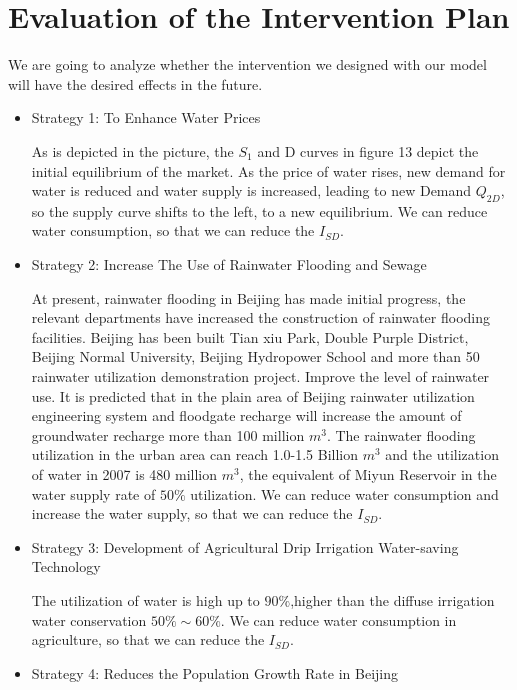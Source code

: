\documentclass{mcmthesis}
\begin{document}
\section{Evaluation of the Intervention Plan}
\par We are going to analyze whether the intervention we designed with our model will have the desired effects in the future.
\begin{itemize}
	\item Strategy 1: To Enhance Water Prices
	
	\par As is depicted in the picture, the $S_1$ and D curves in figure 13 depict the initial equilibrium of the market. As the price of water rises, new demand for water is reduced and water supply is increased, leading to new Demand $Q_{2D}$, so the supply curve shifts to the left, to a new equilibrium. We can reduce water consumption, so that we can reduce the $I_{SD}$.
	\item Strategy 2: Increase The Use of Rainwater Flooding and Sewage
	
	\par At present, rainwater flooding in Beijing has made initial progress, the relevant departments have increased the construction of rainwater flooding facilities. Beijing has been built Tian xiu Park, Double Purple District, Beijing Normal University, Beijing Hydropower School and more than 50 rainwater utilization demonstration project. Improve the level of rainwater use. It is predicted that in the plain area of Beijing rainwater utilization engineering system and floodgate recharge will increase the amount of groundwater recharge more than 100 million $m^3$. The rainwater flooding utilization in the urban area can reach 1.0-1.5 Billion $m^3$ and the utilization of water in 2007 is 480 million $m^3$, the equivalent of Miyun Reservoir in the water supply rate of $50\%$ utilization. We can reduce water consumption and increase the water supply, so that we can reduce the $I_{SD}$. 
	\item Strategy 3: Development of Agricultural Drip Irrigation Water-saving Technology
	
	\par The utilization of water is high up to $90\%$,higher than the diffuse irrigation water conservation $50\% \sim 60\%$. We can reduce water consumption in agriculture, so that we can reduce the $I_{SD}$. 
	\item Strategy 4: Reduces the Population Growth Rate in Beijing
	

\end{itemize}
\end{document}
